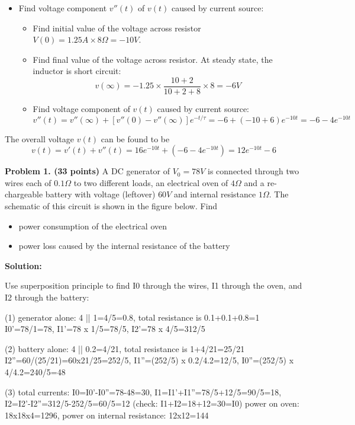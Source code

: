 \begin{enumerate}
\begin{itemize}
\item Find voltage component $v''(t)$ of $v(t)$ caused by current source:
\begin{itemize}
\item Find initial value of the voltage across resistor $V(0)=1.25A\times 8 
  \Omega=-10V$. 
\item Find final value of the voltage across resistor. At steady state, the 
  inductor is short circuit:
  \[ v(\infty)=-1.25\times \frac{10+2}{10+2+8}\times 8=-6V \]
\item Find voltage component of $v(t)$ caused by current source:
  \[ v''(t)=v''(\infty)+[v''(0)-v''(\infty)] e^{-t/\tau}
           =-6+(-10+6) e^{-10t}=-6-4 e^{-10t} \]
\end{itemize}
\end{itemize}
The overall voltage $v(t)$ can be found to be
\[ v(t)=v'(t)+v''(t)=16 e^{-10t}+(-6-4 e^{-10t})=12 e^{-10t}-6 \]

\end{enumerate}



\item {\bf Problem 1. (33 points)} 
A DC generator of $V_0=78V$ is connected through two wires each of 
$0.1\Omega$ to two different loads, an electrical oven of $4\Omega$ 
and a re-chargeable battery with voltage (leftover) $60V$ and internal 
resistance $1\Omega$. The schematic of this circuit is shown in the 
figure below. Find
\begin{itemize}
	\item power consumption of the electrical oven
	\item power loss caused by the internal resistance of the battery
\end{itemize}


{\bf Solution:}

 Use superposition principle to find I0 through the wires, I1 through
 the oven, and I2 through the battery:

 (1) generator alone: 4 || 1=4/5=0.8, total resistance is 0.1+0.1+0.8=1
 I0'=78/1=78, I1'=78 x 1/5=78/5, I2'=78 x 4/5=312/5

 (2) battery alone: 4 || 0.2=4/21, total resistance is 1+4/21=25/21
 I2''=60/(25/21)=60x21/25=252/5, I1''=(252/5) x 0.2/4.2=12/5,
 I0''=(252/5) x 4/4.2=240/5=48

 (3) total currents:
 I0=I0'-I0''=78-48=30, I1=I1'+I1''=78/5+12/5=90/5=18, 
 I2=I2'-I2''=312/5-252/5=60/5=12 (check: I1+I2=18+12=30=I0)
 power on oven: 18x18x4=1296, power on internal resistance: 12x12=144

